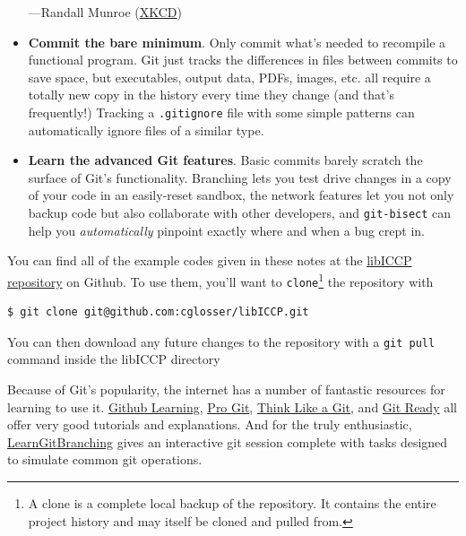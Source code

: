 \begin{itemize}
\begin{marginfigure}[-1.1cm]
  \hspace*{\fill}---Randall Munroe (\href{https://xkcd.com/1296/}{XKCD})
\end{marginfigure}
  \item \textbf{Commit the bare minimum}. Only commit what's needed to recompile a functional program.
    Git just tracks the differences in files between commits to save space, but executables, output data, PDFs, images, etc. all require a totally new copy in the history every time they change (and that's frequently!)
    Tracking a \texttt{.gitignore} file with some simple patterns can automatically ignore files of a similar type.
  \item \textbf{Learn the advanced Git features}. Basic commits barely scratch the surface of Git's functionality.
    Branching lets you test drive changes in a copy of your code in an easily-reset sandbox, the network features let you not only backup code but also collaborate with other developers, and \texttt{git-bisect} can help you \emph{automatically} pinpoint exactly where and when a bug crept in.
\end{itemize}

You can find all of the example codes given in these notes at the \href{https://Github.com/cglosser/libICCP}{libICCP repository} on Github.
To use them, you'll want to \texttt{clone}\footnote{A clone is a complete local backup of the repository. It contains the entire project history and may itself be cloned and pulled from.} the repository with
\begin{verbatim}
$ git clone git@github.com:cglosser/libICCP.git
\end{verbatim}
You can then download any future changes to the repository with a \texttt{git pull} command inside the libICCP directory

Because of Git's popularity, the internet has a number of fantastic resources for learning to use it. 
\href{http://learn.Github.com/p/index.html}{Github Learning}, \href{http://git-scm.com/book}{Pro Git}, \href{http://think-like-a-git.net/}{Think Like a Git}, and \href{http://gitready.com/}{Git Ready} all offer very good tutorials and explanations.
And for the truly enthusiastic, \href{http://pcottle.github.io/learnGitBranching/}{LearnGitBranching} gives an interactive git session complete with tasks designed to simulate common git operations.

\vfill

